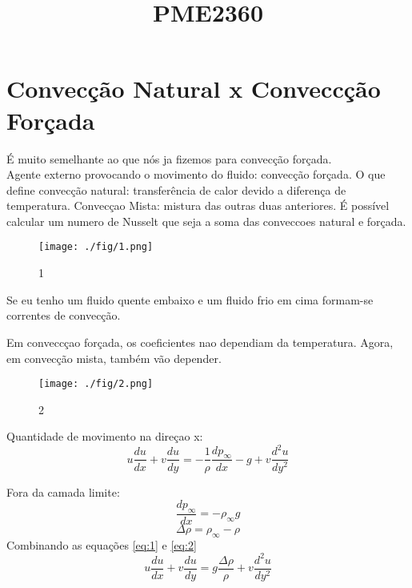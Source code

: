 \documentclass[a4paper, 12pt]{article}
\title{PME2360}
\begin{document}
\maketitle

\section{Convecção Natural x Conveccção Forçada}
É muito semelhante ao que nós ja fizemos para convecção forçada.\\
Agente externo provocando o movimento do fluido: convecção forçada.
O que define convecção natural: transferência de calor devido a diferença
de temperatura.
Convecçao Mista: mistura das outras duas anteriores.
É possível calcular um numero de Nusselt que seja a soma das conveccoes 
natural e forçada.

\begin{figure}[h]
\begin{center}
\texttt{[image: ./fig/1.png]}
\caption{\label{fig:1}1} 
\end{center}
\end{figure}

Se eu tenho um fluido quente embaixo e um fluido frio em cima formam-se correntes de convecção.

Em conveccçao forçada, os coeficientes nao dependiam da temperatura.
Agora, em convecção mista, também vão depender.

\begin{figure}[h]
\begin{center}
\texttt{[image: ./fig/2.png]}
\caption{\label{fig:2}2} 
\end{center}
\end{figure}

Quantidade de movimento na direçao x:
\begin{equation}
u\frac{du}{dx}+v\frac{du}{dy}=-\frac{1}{\rho}\frac{dp_{\infty}}{dx}-g+v\frac{d^{2}u}{dy^{2}}
\label{eq:1}
\end{equation}

Fora da camada limite:
\begin{equation}
\frac{dp_{\infty}}{dx}=-\rho_{\infty}g
\label{eq:2}
\end{equation}
\[\Delta \rho = \rho _{\infty}-\rho\]
Combinando as equações \ref{eq:1} e \ref{eq:2}
\begin{equation}
u\frac{du}{dx}+v\frac{du}{dy}=g\frac{\Delta \rho}{\rho}+v\frac{d^{2}u}{dy^{2}}
\label{eq:3}
\end{equation}
\end{document}
